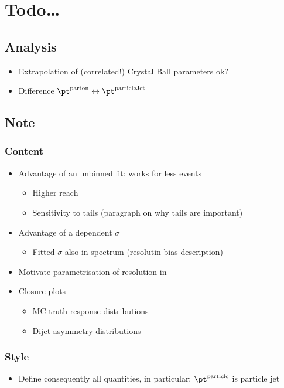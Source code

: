 

\section{Todo\ldots}

\subsection{Analysis}
\begin{itemize}
\item Extrapolation of (correlated!) Crystal Ball parameters ok?
\item Difference $\pt^{\text{parton}} \leftrightarrow \pt^{\text{particleJet}}$
\end{itemize}


\subsection{Note}

\subsubsection{Content}
\begin{itemize}
\item Advantage of an unbinned fit: works for less events
  \begin{itemize}
  \item Higher \pt reach
  \item Sensitivity to tails (paragraph on why tails are important)
  \end{itemize}
\item Advantage of a \pt dependent $\sigma$
  \begin{itemize}
  \item Fitted $\sigma$ also in spectrum (resolutin bias description)
  \end{itemize}
\item Motivate parametrisation of resolution in \pt
\item Closure plots
  \begin{itemize}
  \item MC truth response distributions
  \item Dijet asymmetry distributions
  \end{itemize}
\end{itemize}

\subsubsection{Style}
\begin{itemize}
\item Define consequently all quantities, in particular: $\pt^{\text{particle}}$ is particle jet \pt
\end{itemize}
